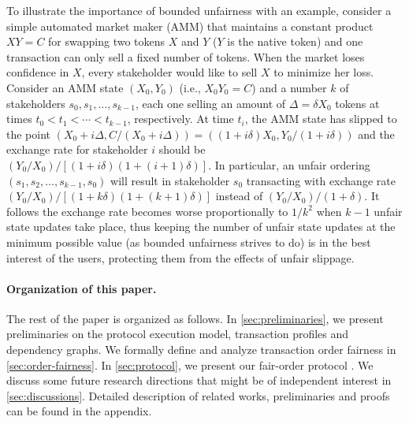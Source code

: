 To illustrate the importance of bounded unfairness with an example, consider a simple automated market maker (AMM) that maintains a constant product $XY = C$ for swapping two tokens $X$ and $Y$ ($Y$ is the native token) and one transaction can only sell a fixed number of tokens.
%
When the market loses confidence in $X$, every stakeholder would like to sell $X$ to minimize her loss.
%
Consider an AMM state $(X_0, Y_0)$ (i.e., $X_0 Y_0 = C$) and a number $k$ of stakeholders $s_0, s_1, \dots, s_{k - 1}$, each one selling an amount of $\Delta = \delta X_0$ tokens at times $t_0 < t_1 < \cdots < t_{k - 1}$, respectively.
%
At time $t_i$, the AMM state has slipped to the point $(X_0 + i \Delta, C / (X_0 + i \Delta)) = ((1 + i \delta) X_0, Y_0 / (1 + i \delta))$ and the exchange rate for stakeholder $i$ should be $(Y_0 / X_0) / [(1 + i \delta)(1 + (i + 1) \delta)]$.
%
In particular, an unfair ordering $(s_1, s_2, \dots, s_{k-1}, s_0)$ will result in stakeholder $s_0$ transacting with exchange rate $(Y_0 / X_0) / [(1 + k\delta)(1 + (k + 1)\delta)]$ instead of $(Y_0 / X_0)/(1 + \delta)$.
%
It follows the exchange rate becomes worse proportionally to $1 / k^2$  when $k-1$ unfair state updates take place, thus keeping the number of unfair state updates at the minimum possible value (as bounded unfairness strives to do) is in the best interest of the users, protecting them from the effects of unfair slippage.



\paragraph{Organization of this paper.}
%
The rest of the paper is organized as follows.
%
In \cref{sec:preliminaries}, we present preliminaries on the protocol execution model, transaction profiles and dependency graphs.
%
We formally define and analyze transaction order fairness in \cref{sec:order-fairness}.
%
In \cref{sec:protocol}, we present our fair-order protocol \Taxis.
%
We discuss some future research directions that might be of independent interest in \cref{sec:discussions}.
%
Detailed description of related works, preliminaries and proofs can be found in the appendix.
